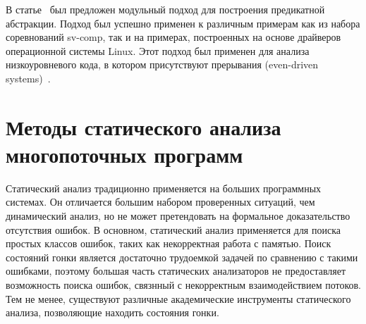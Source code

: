 
В статье~\cite{Kusano:2016:FCT} был предложен модульный подход для построения предикатной абстракции.
Подход был успешно применен к различным примерам как из набора соревнований sv-comp, так и на примерах, построенных на основе драйверов операционной системы Linux.
Этот подход был применен для анализа низкоуровневого кода, в котором присутствуют прерывания (even-driven systems)~\cite{Sung:2017}.

\section{Методы статического анализа многопоточных программ}
\label{rw:static}

Статический анализ традиционно применяется на больших программных системах.
Он отличается большим набором проверенных ситуаций, чем динамический анализ, но не может претендовать на формальное доказательство отсутствия ошибок.
В основном, статический анализ применяется для поиска простых классов ошибок, таких как некорректная работа с памятью.
Поиск состояний гонки является достаточно трудоемкой задачей по сравнению с такими ошибками, поэтому большая часть статических анализаторов не предоставляет возможность поиска ошибок, связнный с некорректным взаимодействием потоков.
Тем не менее, существуют различные академические инструменты статического анализа, позволяющие находить состояния гонки.

